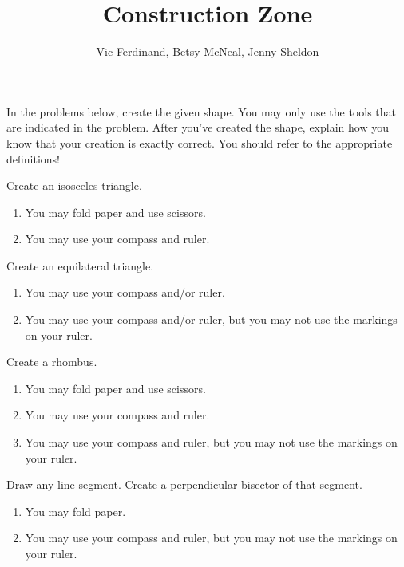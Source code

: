 \documentclass[nooutcomes]{ximera}
\title{Construction Zone}
\author{Vic Ferdinand, Betsy McNeal, Jenny Sheldon}
\begin{document}
\begin{abstract}
\end{abstract}
\maketitle



In the problems below, create the given shape.  You may only use the tools that are indicated in the problem.  After you've created the shape, explain how you know that your creation is exactly correct.  You should refer to the appropriate definitions!

\begin{problem}
Create an isosceles triangle.
\begin{enumerate}
\item You may fold paper and use scissors.
\item You may use your compass and ruler.
\end{enumerate}
\end{problem}

\begin{problem}
Create an equilateral triangle.
\begin{enumerate}

\item You may use your compass and/or ruler.
\item You may use your compass and/or ruler, but you may not use the markings on your ruler.
\end{enumerate}
\end{problem}

\begin{problem}
Create a rhombus.
\begin{enumerate}
\item You may fold paper and use scissors.
\item You may use your compass and ruler.
\item You may use your compass and ruler, but you may not use the markings on your ruler.
\end{enumerate}
\end{problem}

\begin{problem}
Draw any line segment.  Create a perpendicular bisector of that segment.
\begin{enumerate}
\item You may fold paper.
\item You may use your compass and ruler, but you may not use the markings on your ruler.
\end{enumerate}
\end{problem}
\end{document}
